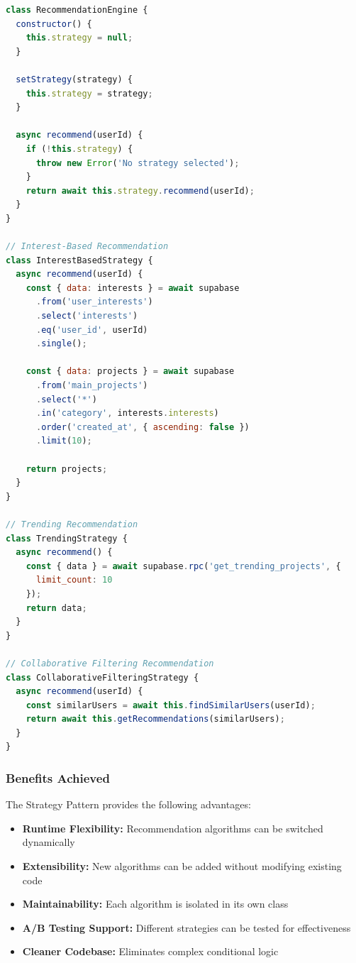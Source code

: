 \documentclass[a4paper,12pt]{report}
\begin{document}
\begin{lstlisting}[language=JavaScript, numbers=none, caption={Strategy Pattern Implementation}]
class RecommendationEngine {
  constructor() {
    this.strategy = null;
  }

  setStrategy(strategy) {
    this.strategy = strategy;
  }

  async recommend(userId) {
    if (!this.strategy) {
      throw new Error('No strategy selected');
    }
    return await this.strategy.recommend(userId);
  }
}

// Interest-Based Recommendation
class InterestBasedStrategy {
  async recommend(userId) {
    const { data: interests } = await supabase
      .from('user_interests')
      .select('interests')
      .eq('user_id', userId)
      .single();

    const { data: projects } = await supabase
      .from('main_projects')
      .select('*')
      .in('category', interests.interests)
      .order('created_at', { ascending: false })
      .limit(10);

    return projects;
  }
}

// Trending Recommendation
class TrendingStrategy {
  async recommend() {
    const { data } = await supabase.rpc('get_trending_projects', {
      limit_count: 10
    });
    return data;
  }
}

// Collaborative Filtering Recommendation
class CollaborativeFilteringStrategy {
  async recommend(userId) {
    const similarUsers = await this.findSimilarUsers(userId);
    return await this.getRecommendations(similarUsers);
  }
}
\end{lstlisting}

\subsubsection{Benefits Achieved}
The Strategy Pattern provides the following advantages:
\begin{itemize}
    \item \textbf{Runtime Flexibility:} Recommendation algorithms can be switched dynamically
    \item \textbf{Extensibility:} New algorithms can be added without modifying existing code
    \item \textbf{Maintainability:} Each algorithm is isolated in its own class
    \item \textbf{A/B Testing Support:} Different strategies can be tested for effectiveness
    \item \textbf{Cleaner Codebase:} Eliminates complex conditional logic
\end{itemize}
\end{document}
